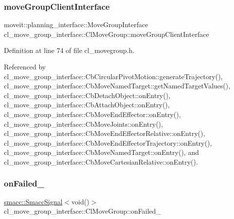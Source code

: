 \subsubsection{\texorpdfstring{move\+Group\+Client\+Interface}{moveGroupClientInterface}}
{\footnotesize\ttfamily moveit\+::planning\+\_\+interface\+::\+Move\+Group\+Interface cl\+\_\+move\+\_\+group\+\_\+interface\+::\+Cl\+Move\+Group\+::move\+Group\+Client\+Interface}



Definition at line 74 of file cl\+\_\+movegroup.\+h.



Referenced by cl\+\_\+move\+\_\+group\+\_\+interface\+::\+Cb\+Circular\+Pivot\+Motion\+::generate\+Trajectory(), cl\+\_\+move\+\_\+group\+\_\+interface\+::\+Cb\+Move\+Named\+Target\+::get\+Named\+Target\+Values(), cl\+\_\+move\+\_\+group\+\_\+interface\+::\+Cb\+Detach\+Object\+::on\+Entry(), cl\+\_\+move\+\_\+group\+\_\+interface\+::\+Cb\+Attach\+Object\+::on\+Entry(), cl\+\_\+move\+\_\+group\+\_\+interface\+::\+Cb\+Move\+End\+Effector\+::on\+Entry(), cl\+\_\+move\+\_\+group\+\_\+interface\+::\+Cb\+Move\+Joints\+::on\+Entry(), cl\+\_\+move\+\_\+group\+\_\+interface\+::\+Cb\+Move\+End\+Effector\+Relative\+::on\+Entry(), cl\+\_\+move\+\_\+group\+\_\+interface\+::\+Cb\+Move\+End\+Effector\+Trajectory\+::on\+Entry(), cl\+\_\+move\+\_\+group\+\_\+interface\+::\+Cb\+Move\+Named\+Target\+::on\+Entry(), and cl\+\_\+move\+\_\+group\+\_\+interface\+::\+Cb\+Move\+Cartesian\+Relative\+::on\+Entry().

\mbox{\label{classcl__move__group__interface_1_1ClMoveGroup_a3e0ea6acf70a0c527864b712b215033b}} 
\subsubsection{\texorpdfstring{on\+Failed\+\_\+}{onFailed\_}}
{\footnotesize\ttfamily \hyperlink{classsmacc_1_1SmaccSignal}{smacc\+::\+Smacc\+Signal}$<$void()$>$ cl\+\_\+move\+\_\+group\+\_\+interface\+::\+Cl\+Move\+Group\+::on\+Failed\+\_\+\hspace{0.3cm}{\ttfamily [private]}}



